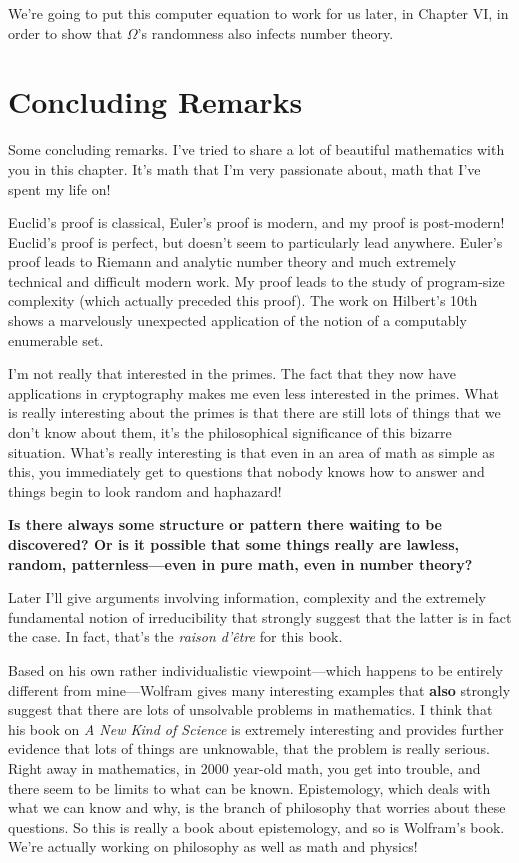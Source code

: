 \documentclass[12pt]{book}
\begin{document}
We're going to put this computer equation to work for us later,
in Chapter VI, in order to show that $\Omega$'s randomness also 
infects number theory.

\section*{Concluding Remarks}

Some concluding remarks.
I've tried to share a lot of beautiful mathematics with you in this chapter.
It's math that I'm very passionate about, math that I've spent my life on!
 
Euclid's proof is classical, Euler's proof is modern, and my proof is post-modern!
Euclid's proof is perfect, but doesn't seem to particularly lead anywhere.
Euler's proof leads to Riemann and analytic number theory and much extremely technical and
difficult modern work.
My proof leads to the study of program-size complexity (which actually preceded this proof).
The work on Hilbert's 10th shows a marvelously unexpected application of the notion of a computably
enumerable set.
 
I'm not really that interested in the primes.  The fact that they now have applications in
cryptography makes me even less interested in the primes.  What is really interesting
about the primes is that there are still lots of things that we don't know about them,
it's the philosophical significance of this bizarre situation.  
What's really interesting is that even
in an area of math as simple as this, you immediately get to questions that nobody knows
how to answer and things begin to look random and haphazard!  
 
\textbf{Is there always some structure or pattern there waiting to be discovered?
Or is it possible that some things 
\textbf{really are} lawless, random, patternless---even in pure math, even
in number theory?}
 
Later I'll give arguments involving information, complexity and the 
extremely fundamental notion of irreducibility that
strongly suggest that the latter is in fact the case.
In fact, that's the \emph{raison d'\^etre} for this book.
 
Based on his own rather individualistic viewpoint---which happens to be 
entirely different from mine---Wolfram gives many interesting examples 
that \textbf{also} strongly suggest
that there are lots of unsolvable problems in mathematics. I think
that his  book on \emph{A New Kind of Science}
is extremely interesting and provides further evidence that lots of things are unknowable,
that the problem is really serious.
Right away in mathematics, in 2000 year-old math, you get into trouble, and there seem
to be limits to what can be known.  Epistemology, which deals with what we can know and why,
is the branch
of philosophy that worries about these questions.  So this is really a book about
epistemology, and so is Wolfram's book.
We're actually working on philosophy as well as math and physics!
 
\end{document}

